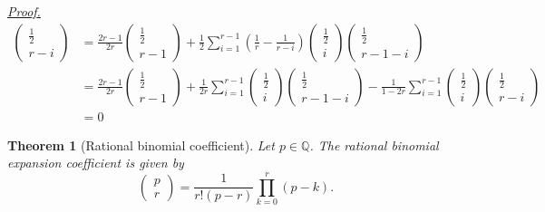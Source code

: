 \documentclass[12pt]{article}
\newtheorem*{theorem}{Theorem}
\renewenvironment{proof}[1][Proof]{\begin{snugshade*} \underline{\textit{{#1}.}}\\}{\hfill \qedsymbol \end{snugshade*}}
\begin{document}
\begin{proof}
\begin{align*}
\begin{pmatrix}
                \frac{1}{2}\\r-i
            \end{pmatrix}&=\frac{2r-1}{2r}\begin{pmatrix}
                \frac{1}{2}\\r-1
            \end{pmatrix}+\frac{1}{2}\sum_{i=1}^{r-1}(\frac{1}{r}-\frac{1}{r-i})\begin{pmatrix}
                \frac{1}{2}\\i
            \end{pmatrix}\begin{pmatrix}
                \frac{1}{2}\\r-1-i
            \end{pmatrix}\\
            &=\frac{2r-1}{2r}\begin{pmatrix}
                \frac{1}{2}\\r-1
            \end{pmatrix}+\frac{1}{2r}\sum_{i=1}^{r-1}\begin{pmatrix}
                \frac{1}{2}\\i
            \end{pmatrix}\begin{pmatrix}
                \frac{1}{2}\\r-1-i
            \end{pmatrix}-\frac{1}{1-2r}\sum_{i=1}^{r-1}\begin{pmatrix}
                \frac{1}{2}\\i
            \end{pmatrix}\begin{pmatrix}
                \frac{1}{2}\\r-i
            \end{pmatrix}\\
            &=0
        \end{align*}
        
    \end{proof}

    \begin{theorem}[Rational binomial coefficient]
        Let $p\in\mathbb{Q}$. The rational binomial expansion coefficient is given by \[\begin{pmatrix}
            p\\r
        \end{pmatrix}=\frac{1}{r!(p-r)}\prod_{k=0}^{r}(p-k).\]
    \end{theorem}
\end{document}

